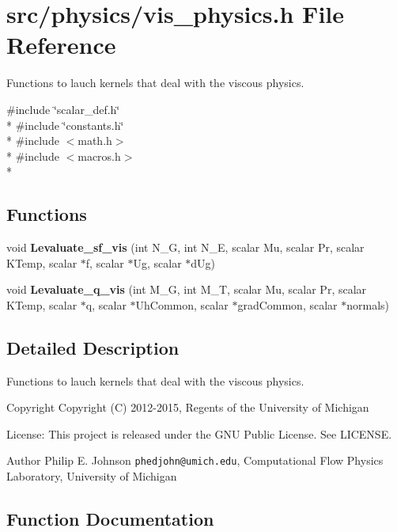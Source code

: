 \section{src/physics/vis\-\_\-physics.h File Reference}
\label{vis__physics_8h}


Functions to lauch kernels that deal with the viscous physics.  


{\ttfamily \#include \char`\"{}scalar\-\_\-def.\-h\char`\"{}}\\*
{\ttfamily \#include \char`\"{}constants.\-h\char`\"{}}\\*
{\ttfamily \#include $<$math.\-h$>$}\\*
{\ttfamily \#include $<$macros.\-h$>$}\\*
\subsection*{Functions}
\begin{DoxyCompactItemize}
\item 
void {\bf Levaluate\-\_\-sf\-\_\-vis} (int N\-\_\-\-G, int N\-\_\-\-E, scalar Mu, scalar Pr, scalar K\-Temp, scalar $\ast$f, scalar $\ast$Ug, scalar $\ast$d\-Ug)
\item 
void {\bf Levaluate\-\_\-q\-\_\-vis} (int M\-\_\-\-G, int M\-\_\-\-T, scalar Mu, scalar Pr, scalar K\-Temp, scalar $\ast$q, scalar $\ast$Uh\-Common, scalar $\ast$grad\-Common, scalar $\ast$normals)
\end{DoxyCompactItemize}


\subsection{Detailed Description}
Functions to lauch kernels that deal with the viscous physics. \begin{DoxyCopyright}{Copyright}
Copyright (C) 2012-\/2015, Regents of the University of Michigan 
\end{DoxyCopyright}
\begin{DoxyParagraph}{License\-:}
This project is released under the G\-N\-U Public License. See L\-I\-C\-E\-N\-S\-E. 
\end{DoxyParagraph}
\begin{DoxyAuthor}{Author}
Philip E. Johnson {\tt phedjohn@umich.\-edu}, Computational Flow Physics Laboratory, University of Michigan 
\end{DoxyAuthor}


\subsection{Function Documentation}

